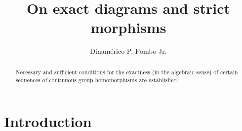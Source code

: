 \documentclass[12pt]{amsart}
\theoremstyle{theorem}
\theoremstyle{definition}
\theoremstyle{remark} \theoremstyle{question} \theoremstyle{example}
\begin{document}

\title[On exact diagrams and strict morphisms]
      {On exact diagrams and strict morphisms}




\author{Dinam\'erico P. Pombo Jr.}
\address{Instituto de Matem\'atica e Estat\'istica, Universidade Federal
Fluminense, Rua Professor Marcos Waldemar de Freitas Reis,
s/n${}^{\underline{\rm o}}$, Bloco G, Campus do Gragoat\'a,
24210-201, Niter\'oi, RJ, Brasil.}

\curraddr{}





\date{}

\dedicatory{}

\begin{abstract}
Necessary and sufficient conditions for the exactness (in the
algebraic sense) of certain sequences of continuous group
homomorphisms are established.
\end{abstract}

\maketitle




\section{Introduction}
\end{document}
